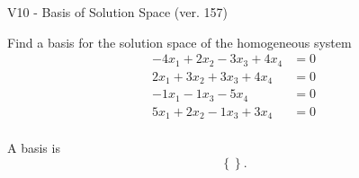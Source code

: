 \begin{exercise}
  \begin{exerciseTitle}V10 - Basis of Solution Space (ver. 157)\end{exerciseTitle}
  \begin{exerciseStatement}
    Find a basis for the solution space of the homogeneous system 
\begin{align*}
 -4 x_ 1 + 2 x_ 2 -3 x_ 3 + 4 x_ 4 &= 0  \\ 
  2 x_ 1 + 3 x_ 2 + 3 x_ 3 + 4 x_ 4 &= 0  \\ 
  -1 x_ 1 -1 x_ 3 -5 x_ 4 &= 0  \\ 
  5 x_ 1 + 2 x_ 2 -1 x_ 3 + 3 x_ 4 &= 0  \\ 
 \end{align*}


 
  \end{exerciseStatement}

  \begin{exerciseAnswer}
   A basis is   
\[\left\{\right\}.\]

  


  \end{exerciseAnswer}
\end{exercise}